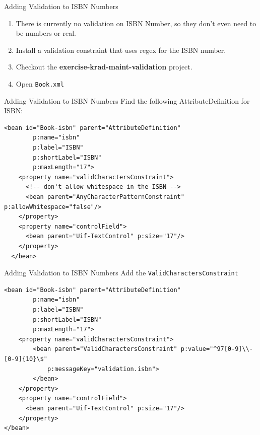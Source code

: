 \documentclass[xcolor=dvipsnames,14pt,professionalfonts]{beamer}
\begin{document}
\begin{frame}{Adding Validation to ISBN Numbers}
  \begin{enumerate}
  \item There is currently no validation on ISBN Number, so they don't
    even need to be numbers or real.
  \item Install a validation constraint that uses regex for the ISBN number.
  \item Checkout the \textbf{exercise-krad-maint-validation}
    project.
  \item Open \texttt{Book.xml}
  \end{enumerate}
\end{frame}

\begin{frame}[fragile]{Adding Validation to ISBN Numbers}
 Find the following AttributeDefinition for ISBN:
    \begin{verbatim}
<bean id="Book-isbn" parent="AttributeDefinition"
        p:name="isbn"
        p:label="ISBN"
        p:shortLabel="ISBN"
        p:maxLength="17">
    <property name="validCharactersConstraint">
      <!-- don't allow whitespace in the ISBN -->
      <bean parent="AnyCharacterPatternConstraint" p:allowWhitespace="false"/>
    </property>
    <property name="controlField">
      <bean parent="Uif-TextControl" p:size="17"/>
    </property>
  </bean>
    \end{verbatim}
    
\end{frame}

\begin{frame}[fragile]{Adding Validation to ISBN Numbers}
Add the \texttt{ValidCharactersConstraint}
    \begin{verbatim}
<bean id="Book-isbn" parent="AttributeDefinition"
        p:name="isbn"
        p:label="ISBN"
        p:shortLabel="ISBN"
        p:maxLength="17">
    <property name="validCharactersConstraint">
		<bean parent="ValidCharactersConstraint" p:value="^97[0-9]\\-[0-9]{10}\$" 
			p:messageKey="validation.isbn">
		</bean>
    </property>
    <property name="controlField">
      <bean parent="Uif-TextControl" p:size="17"/>
    </property>
</bean>
    \end{verbatim}
    
\end{frame}
\end{document}
